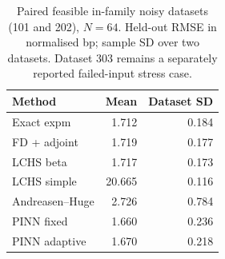 \begin{table}[htbp]\centering\caption{Paired feasible in-family noisy datasets (101 and 202), $N=64$. Held-out RMSE in normalised bp; sample SD over two datasets. Dataset 303 remains a separately reported failed-input stress case.}\small
\begin{tabular}{lrr}\toprule Method & Mean & Dataset SD\\\midrule
Exact expm & 1.712 & 0.184\\
FD + adjoint & 1.719 & 0.177\\
LCHS beta & 1.717 & 0.173\\
LCHS simple & 20.665 & 0.116\\
Andreasen--Huge & 2.726 & 0.784\\
PINN fixed & 1.660 & 0.236\\
PINN adaptive & 1.670 & 0.218\\
\bottomrule\end{tabular}\end{table}